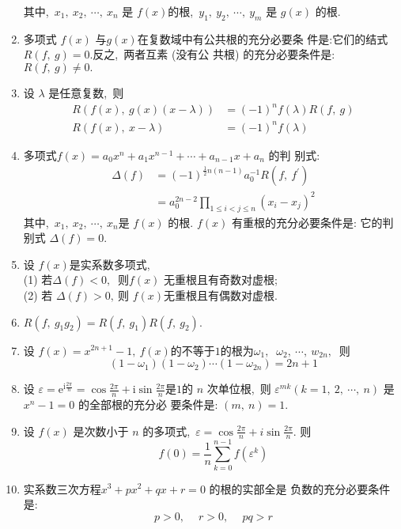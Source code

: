 \begin{enumerate}
		其中,\   $x_{1},\  x_{2},\  \cdots,\  x_{n}$  是 $ f(x)  $的根,\  $ y_{1},\  y_{2},\  \cdots,\  y_{m} $ 是  $g(x)$  的根.
		
		\item 多项式  $f(x)$  与$  g(x)  $在复数域中有公共根的充分必要条 件是:它们的结式 $ R(f,\  g)=0 . $反之,\  两者互素 (没有公 共根) 的充分必要条件是: $ R(f,\  g) \neq 0 .$
		\item 设 $ \lambda $ 是任意复数,\  则
		$$\begin{aligned}
			R(f(x),\  g(x)(x-\lambda)) &=(-1)^{n} f(\lambda) R(f,\  g) \\
			R(f(x),\  x-\lambda) &=(-1)^{n} f(\lambda)
		\end{aligned}$$
		\item 多项式$  f(x)=a_{0} x^{n}+a_{1} x^{n-1}+\cdots+a_{n-1} x+a_{n} $ 的判 别式:
		$$\begin{aligned}
			\Delta(f) &=(-1)^{\frac{1}{2} n(n-1)} a_{0}^{-1} R\left(f,\  f^{\prime}\right) \\
			&=a_{0}^{2 n-2} \prod_{1 \leqslant i<j \leqslant n}\left(x_{i}-x_{j}\right)^{2}
		\end{aligned}$$
		其中,\  $ x_{1},\  x_{2},\  \cdots,\  x_{n}  $是  $f(x) $ 的根.
		$f(x) $ 有重根的充分必要条件是: 它的判别式 $ \Delta(f)=0 .$
		\item 设 $ f(x)  $是实系数多项式,\ \\
		(1) 若$ \Delta(f)<0 ,\ $ 则$  f(x)$  无重根且有奇数对虚根;\\
		(2) 若 $ \Delta(f)>0 ,\  $则 $ f(x)  $无重根且有偶数对虚根.
		\item $ R\left(f,\  g_{1} g_{2}\right)=R\left(f,\  g_{1}\right) R\left(f,\  g_{2}\right) .$
		\item 设 $ f(x)=x^{2 n+1}-1,\  f(x)  $的不等于$ 1 $的根为$  \omega_{1},\ $ $\omega_{2} ,\   \cdots,\  w_{2 n} ,\ $ 则
		$$\left(1-\omega_{1}\right)\left(1-\omega_{2}\right) \cdots\left(1-\omega_{2 n}\right)=2 n+1$$
		\item 设  $\varepsilon=\mathrm{e}^{\mathrm{i} \frac{2 \pi}{n}}=\cos \frac{2 \pi}{n}+\mathrm{i} \sin \frac{2 \pi}{n}  $是$ 1 $的  $n$  次单位根,\  则 $ \varepsilon^{m k}(k=1,\ 2,\  \cdots,\  n) $ 是 $ x^{n}-1=0 $ 的全部根的充分必 要条件是: $ (m,\  n)=1 .$
		\item 设  $f(x) $ 是次数小于  $n $ 的多项式,\   $\varepsilon=\cos \frac{2 \pi}{n}+i \sin \frac{2 \pi}{n} .$ 则
		$$f(0)=\frac{1}{n} \sum_{k=0}^{n-1} f\left(\varepsilon^{k}\right)$$
		\item 实系数三次方程$  x^{3}+p x^{2}+q x+r=0 $ 的根的实部全是 负数的充分必要条件是:
		$$p>0,\  \quad r>0,\  \quad p q>r$$

\end{enumerate}
